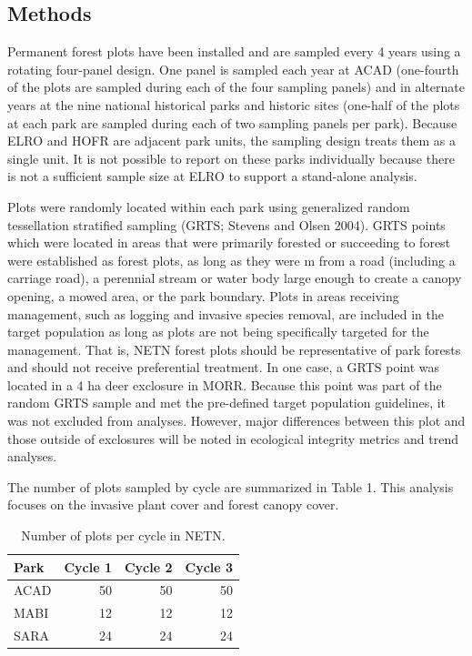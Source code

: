 \documentclass[
  10.5pt,
]{article}
\begin{document}
\hypertarget{methods}{%
\subsection{Methods}\label{methods}}

Permanent forest plots have been installed and are sampled every 4 years using a rotating four-panel design. One panel is sampled each year at ACAD (one-fourth of the plots are sampled during each of the four sampling panels) and in alternate years at the nine national historical parks and historic sites (one-half of the plots at each park are sampled during each of two sampling panels per park). Because ELRO and HOFR are adjacent park units, the sampling design treats them as a single unit. It is not possible to report on these parks individually because there is not a sufficient sample size at ELRO to support a stand-alone analysis.

Plots were randomly located within each park using generalized random tessellation stratified sampling (GRTS; Stevens and Olsen 2004). GRTS points which were located in areas that were primarily forested or succeeding to forest were established as forest plots, as long as they were  m from a road (including a carriage road), a perennial stream or water body large enough to create a canopy opening, a mowed area, or the park boundary. Plots in areas receiving management, such as logging and invasive species removal, are included in the target population as long as plots are not being specifically targeted for the management. That is, NETN forest plots should be representative of park forests and should not receive preferential treatment. In one case, a GRTS point was located in a 4 ha deer exclosure in MORR. Because this point was part of the random GRTS sample and met the pre-defined target population guidelines, it was not excluded from analyses. However, major differences between this plot and those outside of exclosures will be noted in ecological integrity metrics and trend analyses.

The number of plots sampled by cycle are summarized in Table 1. This analysis focuses on the invasive plant cover and forest canopy cover.

\begin{table}

\caption{\label{tab:pkable}Number of plots per cycle in NETN.}
\begin{tabular}[t]{l|r|r|r}
\hline
Park & Cycle 1 & Cycle 2 & Cycle 3\\
\hline
ACAD & 50 & 50 & 50\\
\hline
MABI & 12 & 12 & 12\\
\hline
SARA & 24 & 24 & 24\\
\hline
\end{tabular}
\end{table}
\end{document}
